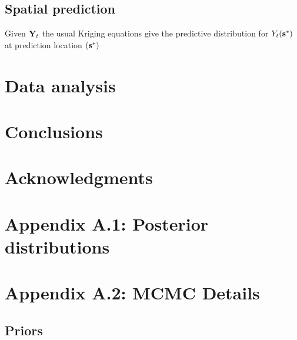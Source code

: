 \documentclass[11pt]{article}
\begin{document}
\subsection{Spatial prediction}\label{s:pred}
Given $\mbox{\bf Y}_t$ the usual Kriging equations give the predictive distribution for $Y_t(\mbox{\bf s}^*)$ at prediction location $(\mbox{\bf s}^*)$


\section{Data analysis}\label{s:analysis}


\section{Conclusions}\label{s:con}

\section*{Acknowledgments}

\section*{Appendix A.1: Posterior distributions}





\section*{Appendix A.2: MCMC Details}

\subsection*{Priors}





\end{document}
